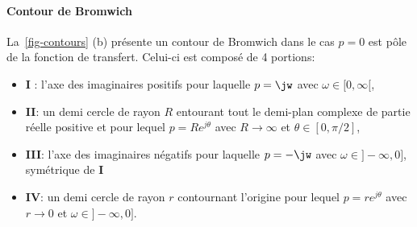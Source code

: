 \paragraph{Contour de Bromwich}
La~\cref{fig-contours} (b) présente un contour de Bromwich dans le cas $p=0$ 
est pôle de la fonction de transfert. Celui-ci est composé de 4 portions:
\begin{itemize}
    \item \textbf{I} : l'axe des imaginaires positifs pour laquelle 
          $p=\jw$ avec $\omega\in[0,\infty[$,
    \item \textbf{II}: un demi cercle de rayon $R$ entourant tout le demi-plan 
          complexe de partie réelle positive 
          et pour lequel $p=Re^{j\theta}$ avec $R\rightarrow\infty$ et 
          $\theta\in[0,\pi/2]$,
    \item \textbf{III}: l'axe des imaginaires négatifs  pour laquelle $p=-\jw$ 
          avec $\omega\in]-\infty,0]$, symétrique de \textbf{I}
    \item \textbf{IV}:  un demi cercle de rayon $r$ contournant l'origine 
          pour lequel $p=re^{j\theta}$ avec $r\rightarrow0$ et 
          $\omega\in]-\infty,0]$.
\end{itemize}
